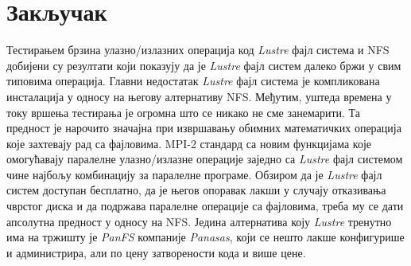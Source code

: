     
\chapter{Закључак}     


 Тестирањем брзина улазно/излазних операција код \textit{Lustre} фајл система и NFS добијени су резултати који показују да је  \textit{Lustre} фајл систем далеко бржи у свим типовима операција. Главни недостатак \textit{Lustre} фајл система је компликована инсталација у односу на његову алтернативу NFS. Међутим, уштеда времена у току вршења тестирања је огромна што се никако не сме занемарити. Та предност је нарочито значајна при извршавању обимних математичких операција које захтевају рад са фајловима. MPI-2 стандард са новим функцијама које омогућавају паралелне улазно/излазне операције заједно са \textit{Lustre} фајл системом чине најбољу комбинацију за паралелне програме. Обзиром да је \textit{Lustre} фајл систем доступан бесплатно, да је његов опоравак лакши у случају отказивања чврстог диска и да подржава паралелне операције са фајловима, треба му се дати апсолутна предност у односу на NFS. Једина алтернатива коју \textit{Lustre} тренутно има на тржишту је \textit{PanFS} компаније \textit{Panasas}, који се нешто лакше конфигурише и администрира, али по цену затворености кода и више цене. 
 
 
 